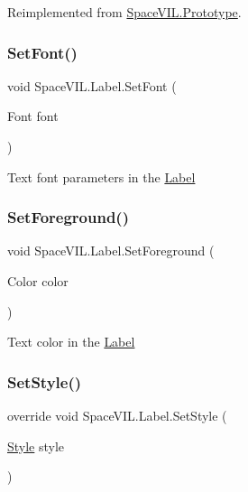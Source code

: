 Reimplemented from \mbox{\hyperlink{class_space_v_i_l_1_1_prototype_ac3379fe02923ee155b5b0084abf27420}{Space\+V\+I\+L.\+Prototype}}.

\mbox{\label{class_space_v_i_l_1_1_label_ae14fde68f34a632420535f72b8f92d86}} 
\subsubsection{\texorpdfstring{Set\+Font()}{SetFont()}}
{\footnotesize\ttfamily void Space\+V\+I\+L.\+Label.\+Set\+Font (\begin{DoxyParamCaption}\item[{Font}]{font }\end{DoxyParamCaption})}



Text font parameters in the \mbox{\hyperlink{class_space_v_i_l_1_1_label}{Label}} 

\mbox{\label{class_space_v_i_l_1_1_label_a0e188eabb84af83b0bedf3c59c08273b}} 
\subsubsection{\texorpdfstring{Set\+Foreground()}{SetForeground()}}
{\footnotesize\ttfamily void Space\+V\+I\+L.\+Label.\+Set\+Foreground (\begin{DoxyParamCaption}\item[{Color}]{color }\end{DoxyParamCaption})}



Text color in the \mbox{\hyperlink{class_space_v_i_l_1_1_label}{Label}} 

\mbox{\label{class_space_v_i_l_1_1_label_ae98bd34b1931300d5a6c908f80260ad8}} 
\subsubsection{\texorpdfstring{Set\+Style()}{SetStyle()}}
{\footnotesize\ttfamily override void Space\+V\+I\+L.\+Label.\+Set\+Style (\begin{DoxyParamCaption}\item[{\mbox{\hyperlink{class_space_v_i_l_1_1_decorations_1_1_style}{Style}}}]{style }\end{DoxyParamCaption})\hspace{0.3cm}{\ttfamily [virtual]}}




